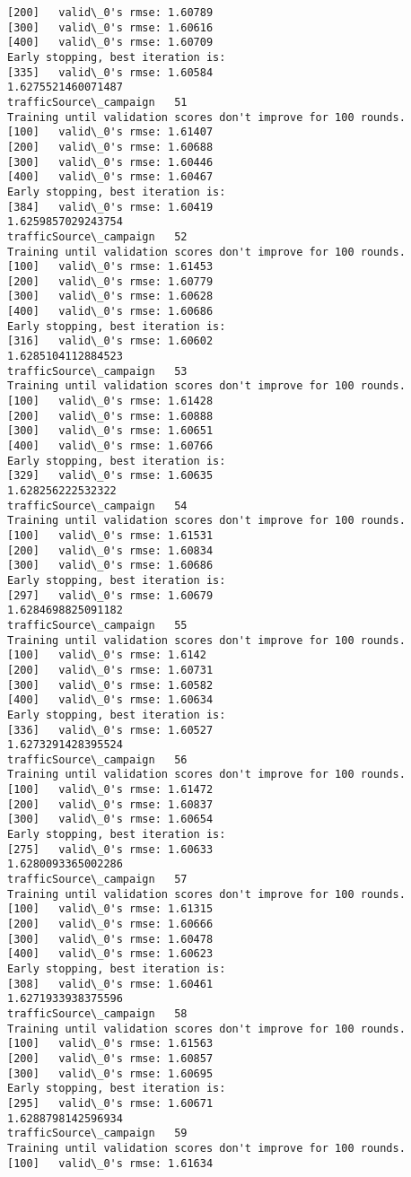 \documentclass[11pt]{article}
\begin{document}
\begin{Verbatim}[commandchars=\\\{\}]
[200]	valid\_0's rmse: 1.60789
[300]	valid\_0's rmse: 1.60616
[400]	valid\_0's rmse: 1.60709
Early stopping, best iteration is:
[335]	valid\_0's rmse: 1.60584
1.6275521460071487
trafficSource\_campaign   51
Training until validation scores don't improve for 100 rounds.
[100]	valid\_0's rmse: 1.61407
[200]	valid\_0's rmse: 1.60688
[300]	valid\_0's rmse: 1.60446
[400]	valid\_0's rmse: 1.60467
Early stopping, best iteration is:
[384]	valid\_0's rmse: 1.60419
1.6259857029243754
trafficSource\_campaign   52
Training until validation scores don't improve for 100 rounds.
[100]	valid\_0's rmse: 1.61453
[200]	valid\_0's rmse: 1.60779
[300]	valid\_0's rmse: 1.60628
[400]	valid\_0's rmse: 1.60686
Early stopping, best iteration is:
[316]	valid\_0's rmse: 1.60602
1.6285104112884523
trafficSource\_campaign   53
Training until validation scores don't improve for 100 rounds.
[100]	valid\_0's rmse: 1.61428
[200]	valid\_0's rmse: 1.60888
[300]	valid\_0's rmse: 1.60651
[400]	valid\_0's rmse: 1.60766
Early stopping, best iteration is:
[329]	valid\_0's rmse: 1.60635
1.628256222532322
trafficSource\_campaign   54
Training until validation scores don't improve for 100 rounds.
[100]	valid\_0's rmse: 1.61531
[200]	valid\_0's rmse: 1.60834
[300]	valid\_0's rmse: 1.60686
Early stopping, best iteration is:
[297]	valid\_0's rmse: 1.60679
1.6284698825091182
trafficSource\_campaign   55
Training until validation scores don't improve for 100 rounds.
[100]	valid\_0's rmse: 1.6142
[200]	valid\_0's rmse: 1.60731
[300]	valid\_0's rmse: 1.60582
[400]	valid\_0's rmse: 1.60634
Early stopping, best iteration is:
[336]	valid\_0's rmse: 1.60527
1.6273291428395524
trafficSource\_campaign   56
Training until validation scores don't improve for 100 rounds.
[100]	valid\_0's rmse: 1.61472
[200]	valid\_0's rmse: 1.60837
[300]	valid\_0's rmse: 1.60654
Early stopping, best iteration is:
[275]	valid\_0's rmse: 1.60633
1.6280093365002286
trafficSource\_campaign   57
Training until validation scores don't improve for 100 rounds.
[100]	valid\_0's rmse: 1.61315
[200]	valid\_0's rmse: 1.60666
[300]	valid\_0's rmse: 1.60478
[400]	valid\_0's rmse: 1.60623
Early stopping, best iteration is:
[308]	valid\_0's rmse: 1.60461
1.6271933938375596
trafficSource\_campaign   58
Training until validation scores don't improve for 100 rounds.
[100]	valid\_0's rmse: 1.61563
[200]	valid\_0's rmse: 1.60857
[300]	valid\_0's rmse: 1.60695
Early stopping, best iteration is:
[295]	valid\_0's rmse: 1.60671
1.6288798142596934
trafficSource\_campaign   59
Training until validation scores don't improve for 100 rounds.
[100]	valid\_0's rmse: 1.61634

\end{Verbatim}
\end{document}
